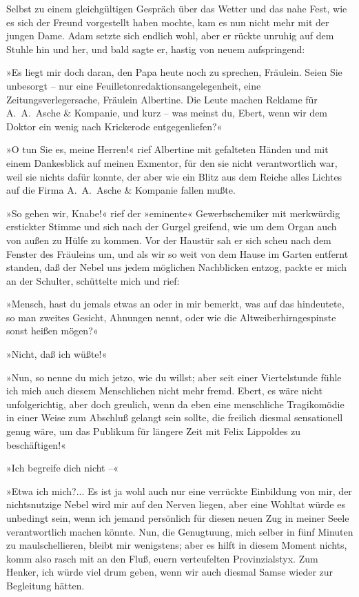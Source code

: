 Selbst zu einem gleichgültigen Gespräch über das Wetter und das
nahe Fest, wie es sich der Freund vorgestellt haben mochte, kam es
nun nicht mehr mit der jungen Dame. Adam setzte sich endlich wohl,
aber er rückte unruhig auf dem Stuhle hin und her, und bald sagte
er, hastig von neuem aufspringend:

»Es liegt mir doch daran, den Papa heute noch zu sprechen,
Fräulein. Seien Sie unbesorgt – nur eine
Feuilletonredaktionsangelegenheit, eine Zeitungsverlegersache,
Fräulein Albertine. Die Leute machen Reklame für A.~A.~Asche \&
Kompanie, und kurz – was meinst du, Ebert, wenn wir dem Doktor ein
wenig nach Krickerode entgegenliefen?«

»O tun Sie es, meine Herren!« rief Albertine mit gefalteten Händen
und mit einem Dankesblick auf meinen Exmentor, für den sie nicht
verantwortlich war, weil sie nichts dafür konnte, der aber wie ein
Blitz aus dem Reiche alles Lichtes auf die Firma A.~A.~Asche \&
Kompanie fallen mußte.

»So gehen wir, Knabe!« rief der »eminente« Gewerbschemiker mit
merkwürdig erstickter Stimme und sich nach der Gurgel greifend, wie
um dem Organ auch von außen zu Hülfe zu kommen. Vor der Haustür sah
er sich scheu nach dem Fenster des Fräuleins um, und als wir so
weit von dem Hause im Garten entfernt standen, daß der Nebel uns
jedem möglichen Nachblicken entzog, packte er mich an der Schulter,
schüttelte mich und rief:

»Mensch, hast du jemals etwas an oder in mir bemerkt, was auf das
hindeutete, so man zweites Gesicht, Ahnungen nennt, oder wie die
Altweiberhirngespinste sonst heißen mögen?«

»Nicht, daß ich wüßte!«

»Nun, so nenne du mich jetzo, wie du willst; aber seit einer
Viertelstunde fühle ich mich auch diesem Menschlichen nicht mehr
fremd. Ebert, es wäre nicht unfolgerichtig, aber doch greulich,
wenn da eben eine menschliche Tragikomödie in einer Weise zum
Abschluß gelangt sein sollte, die freilich diesmal sensationell
genug wäre, um das Publikum für längere Zeit mit Felix Lippoldes zu
beschäftigen!«

»Ich begreife dich nicht –«

»Etwa ich mich?... Es ist ja wohl auch nur eine verrückte
Einbildung von mir, der nichtsnutzige Nebel wird mir auf den Nerven
liegen, aber eine Wohltat würde es unbedingt sein, wenn ich jemand
persönlich für diesen neuen Zug in meiner Seele verantwortlich
machen könnte. Nun, die Genugtuung, mich selber in fünf Minuten zu
maulschellieren, bleibt mir wenigstens; aber es hilft in diesem
Moment nichts, komm also rasch mit an den Fluß, euern verteufelten
Provinzialstyx. Zum Henker, ich würde viel drum geben, wenn wir
auch diesmal Samse wieder zur Begleitung hätten.

